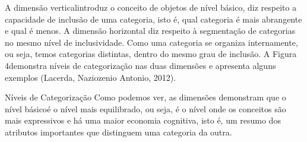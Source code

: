 A dimensão verticalintroduz o conceito de objetos de nível básico, diz respeito a capacidade de inclusão de uma categoria, isto é, qual categoria é mais abrangente e qual é menos. A dimensão horizontal diz respeito à segmentação de categorias no mesmo nível de inclusividade. Como uma categoria se organiza internamente, ou seja, temos categorias distintas, dentro do mesmo grau de inclusão. A Figura 4demonstra níveis de categorização nas duas dimensões e apresenta alguns exemplos (Lacerda, Naziozenio Antonio, 2012).

Níveis de Categorização
Como podemos ver, as dimensões demonstram que o nível básicoé o nível mais equilibrado, ou seja, é o nível onde os conceitos são mais expressivos e há uma maior economia cognitiva, isto é, um resumo dos atributos importantes que distinguem uma categoria da outra.
